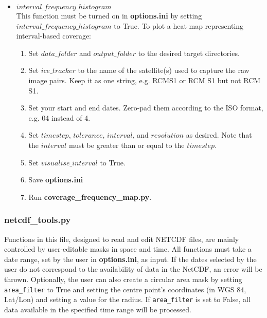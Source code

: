 \documentclass{article}
\begin{document}
\begin{itemize}
            \item{} $interval\_frequency\_histogram$ \\
            This function must be turned on in \textbf{options.ini} by setting $interval\_frequency\_histogram$ to True. To plot a heat map representing interval-based coverage:
            \begin{enumerate}
                \item Set $data\_folder$ and $output\_folder$ to the desired target directories.
                \item Set $ice\_tracker$ to the name of the satellite(s) used to capture the raw image pairs. Keep it as one string, e.g. RCMS1 or RCM$\_$S1 but not RCM S1.
                \item Set your start and end dates. Zero-pad them according to the ISO format, e.g. 04 instead of 4.
                \item Set $timestep$, $tolerance$, $interval$, and $resolution$ as desired. Note that the $interval$ must be greater than or equal to the $timestep$.
                \item Set $visualise\_interval$ to True.
                \item Save \textbf{options.ini}
                \item Run \textbf{coverage\_frequency\_map.py}.
            \end{enumerate}
        \end{itemize}

        \subsubsection{\textbf{netcdf\_tools.py}}

            Functions in this file, designed to read and edit NETCDF files, are mainly controlled by user-editable masks in space and time. All functions must take a date range, set by the user in \textbf{options.ini}, as input. If the dates selected by the user do not correspond to the availability of data in the NetCDF, an error will be thrown. Optionally, the user can also create a circular area mask by setting \verb?area_filter? to True and setting the centre point's coordinates (in WGS 84, Lat/Lon) and setting a value for the radius. If \verb?area_filter? is set to False, all data available in the specified time range will be processed.
\end{document}
